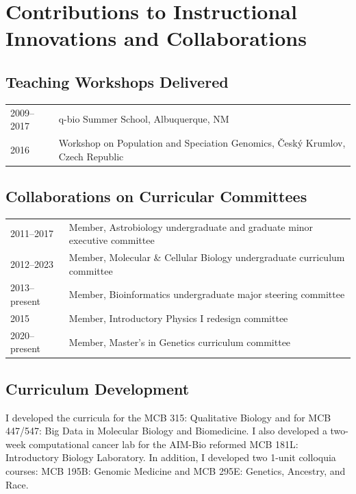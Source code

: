 \documentclass[11pt]{article}
\begin{document}
\section*{Contributions to Instructional Innovations and Collaborations}
\subsection*{Teaching Workshops Delivered}
\begin{longtable}[l]{l l}
2009--2017 & q-bio Summer School, Albuquerque, NM\\
2016 & Workshop on Population and Speciation Genomics, \v{C}esk\'{y} Krumlov, Czech Republic
\end{longtable}


\subsection*{Collaborations on Curricular Committees}
\begin{longtable}[l]{l l}
2011--2017 & Member, Astrobiology undergraduate and graduate minor executive committee\\
2012--2023& Member, Molecular \& Cellular Biology undergraduate curriculum committee\\
2013--present & Member, Bioinformatics undergraduate major steering committee\\
2015 & Member, Introductory Physics I redesign committee\\
2020--present & Member, Master's in Genetics curriculum committee
\end{longtable}

\subsection*{Curriculum Development}
I developed the curricula for the MCB 315: Qualitative Biology and for MCB 447/547: Big Data in Molecular Biology and Biomedicine. I also developed a two-week computational cancer lab for the AIM-Bio reformed MCB 181L: Introductory Biology Laboratory. In addition, I developed two 1-unit colloquia courses: MCB 195B: Genomic Medicine and MCB 295E: Genetics, Ancestry, and Race.
\end{document}
